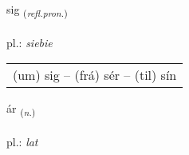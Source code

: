 \documentclass[frontgrid, backgrid]{flacards}\usepackage[]{graphicx}\usepackage[]{xcolor}
\begin{document}
\renewcommand{\blhead}{\vskip5pt {\small\bfseries\footnotesize Fornafn | zaimek }}
\renewcommand{\bcfoot}{\vskip5pt \hspace{2pt}{\small\bfseries\footnotesize 1K}}


{sig \small{\textsubscript{(\textit{refl.pron.})}} \\[1ex] %
\textphonetic{[sɪːɣ]} \\
pl.: \emph{siebie} \\  [2ex]
\renewcommand*{\arraystretch}{0.8}
\begin{tabular}{l}
(um) sig -- (frá) sér -- (til) sín \\ 
\end{tabular}
}

\renewcommand{\flhead}{\vskip5pt \fboxsep=0pt {\small\bfseries\footnotesize Nafnorð | rzeczownik}}
\renewcommand{\fcfoot}{\vskip5pt \fboxsep=0pt \hspace{2pt}{\small\bfseries\footnotesize 1K}}

\renewcommand{\blhead}{\vskip5pt {\small\bfseries\footnotesize Nafnorð | rzeczownik }}
\renewcommand{\bcfoot}{\vskip5pt \hspace{2pt}{\small\bfseries\footnotesize 1K}}


{ár \small{\textsubscript{(\textit{n.})}} \\[1ex] %
\textphonetic{[auːr]} \\
pl.: \emph{lat} \\  [2ex]
\renewcommand*{\arraystretch}{0.8}
}

\renewcommand{\flhead}{\vskip5pt \fboxsep=0pt {\small\bfseries\footnotesize Fornafn | zaimek}}
\renewcommand{\fcfoot}{\vskip5pt \fboxsep=0pt \hspace{2pt}{\small\bfseries\footnotesize 1K}}
\end{document}
